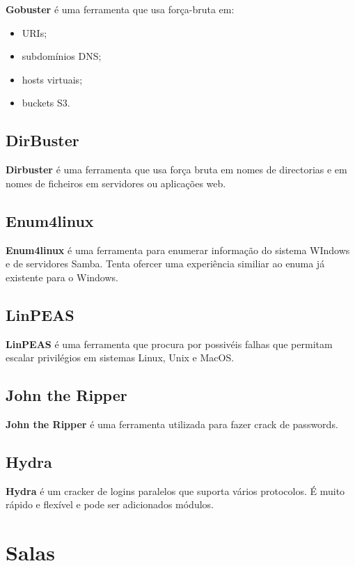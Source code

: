 \documentclass[11pt]{article}
\begin{document}
\textbf{Gobuster} é uma ferramenta que usa força-bruta em:
\begin{itemize}
    \item URIs;
    \item subdomínios DNS;
    \item hosts virtuais;
    \item buckets S3.
\end{itemize}

\subsection{DirBuster}

\textbf{Dirbuster} é uma ferramenta que usa força bruta em nomes de directorias e em nomes de ficheiros em servidores ou aplicações web.

\subsection{Enum4linux}

\textbf{Enum4linux} é uma ferramenta para enumerar informação do sistema WIndows e de servidores Samba. Tenta ofercer uma experiência similiar ao enuma já existente para o Windows.

\subsection{LinPEAS}

\textbf{LinPEAS} é uma ferramenta que procura por possivéis falhas que permitam escalar privilégios em sistemas Linux, Unix e MacOS.

\subsection{John the Ripper}

\textbf{John the Ripper} é uma ferramenta utilizada para fazer crack de passwords.

\subsection{Hydra}

\textbf{Hydra} é um cracker de logins paralelos que suporta vários protocolos. É muito rápido e flexível e pode ser adicionados módulos.

\section{Salas}
\end{document}
